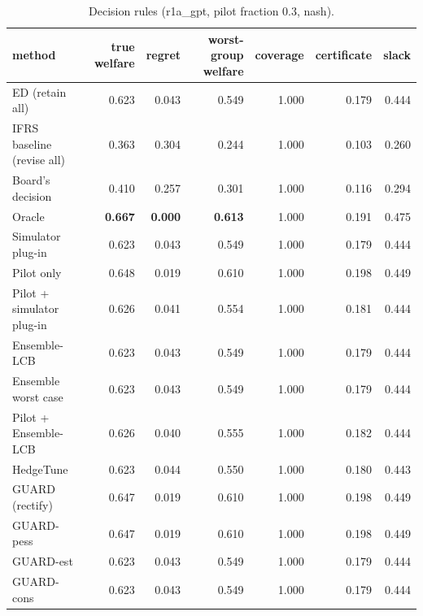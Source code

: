 \begin{table}[t]
\centering
\small
\begin{tabular}{lrrrrrr}
\toprule
method & true welfare & regret & worst-group welfare & coverage & certificate & slack \\
\midrule
ED (retain all) & 0.623 & 0.043 & 0.549 & 1.000 & 0.179 & 0.444 \\
IFRS baseline (revise all) & 0.363 & 0.304 & 0.244 & 1.000 & 0.103 & 0.260 \\
Board's decision & 0.410 & 0.257 & 0.301 & 1.000 & 0.116 & 0.294 \\
Oracle & \textbf{0.667} & \textbf{0.000} & \textbf{0.613} & 1.000 & 0.191 & 0.475 \\
Simulator plug-in & 0.623 & 0.043 & 0.549 & 1.000 & 0.179 & 0.444 \\
Pilot only & 0.648 & 0.019 & 0.610 & 1.000 & 0.198 & 0.449 \\
Pilot + simulator plug-in & 0.626 & 0.041 & 0.554 & 1.000 & 0.181 & 0.444 \\
Ensemble-LCB & 0.623 & 0.043 & 0.549 & 1.000 & 0.179 & 0.444 \\
Ensemble worst case & 0.623 & 0.043 & 0.549 & 1.000 & 0.179 & 0.444 \\
Pilot + Ensemble-LCB & 0.626 & 0.040 & 0.555 & 1.000 & 0.182 & 0.444 \\
HedgeTune & 0.623 & 0.044 & 0.550 & 1.000 & 0.180 & 0.443 \\
GUARD (rectify) & 0.647 & 0.019 & 0.610 & 1.000 & 0.198 & 0.449 \\
GUARD-pess & 0.647 & 0.019 & 0.610 & 1.000 & 0.198 & 0.449 \\
GUARD-est & 0.623 & 0.043 & 0.549 & 1.000 & 0.179 & 0.444 \\
GUARD-cons & 0.623 & 0.043 & 0.549 & 1.000 & 0.179 & 0.444 \\
\bottomrule
\end{tabular}
\caption{Decision rules (r1a\_gpt, pilot fraction 0.3, nash).}
\label{tab:methods-nash}
\end{table}

